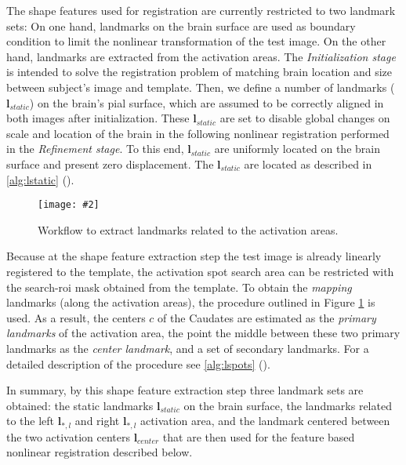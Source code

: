 \documentclass{frontiers}
\newcommand{\insertgraphic}[2]{\texttt{[image: \#2]}}
\newcommand{\cbstart}{\relax}
\newcommand{\cbend}{\relax}
\newcommand{\insertgraphic}[2]{\texttt{[image: \#2]}}
\newcommand{\lm}[1]{\ensuremath{\mathbf{l}_{#1}}}
\begin{document}
\cbstart
The shape features used for registration are currently restricted to two landmark sets:
\cbend
On one hand, landmarks on the brain surface are used as boundary condition to limit the nonlinear 
  transformation of the test image. 
On the other hand, landmarks are extracted from the activation areas. 
\cbstart
The \emph{Initialization stage} is intended to solve the registration problem of matching brain location
  and size between subject's image and template.
Then, we define a number of landmarks (\lm{static}) on the brain's pial surface, which are assumed
  to be correctly aligned in both images after initialization.
These \lm{static} are set to disable global changes on scale and location of the brain in the following
  nonlinear registration performed in the \emph{Refinement stage}.
\cbend
To this end, \lm{static} are uniformly located on the brain surface and present
  zero displacement. The \lm{static} are located as described in \autoref{alg:lstatic} ().

\begin{figure}
\centering
\insertgraphic{width=0.75\linewidth}{figures/03-Segflow}
\caption{ \label{fig:featlmextract} Workflow to extract landmarks related to the activation areas. 
}
\end{figure}

Because at the shape feature extraction step the test image is already linearly registered to the template, 
  the activation spot search area can be restricted with the search-\gls*{roi} mask obtained from the template.
To obtain the \emph{mapping} landmarks (along the activation areas), the procedure
  outlined in Figure \ref{fig:featlmextract} is used.
\cbstart
As a result, the centers $c$ of the Caudates are estimated as the \emph{primary landmarks} of the activation area, the point 
    the middle between these two primary landmarks as the \emph{center landmark}, and a set of secondary landmarks. 
For a detailed description of the procedure see \autoref{alg:lspots} ().
\cbend

\cbstart
In summary, by this shape feature extraction step three landmark sets are obtained: the static landmarks \lm{static} on the 
\cbend
  brain surface, the landmarks related to the left \lm{*,l} and right \lm{*,l} activation area, 
  and the  landmark centered between the two activation centers \lm{center} that are then used for the 
  feature based nonlinear registration described below.
\end{document}
